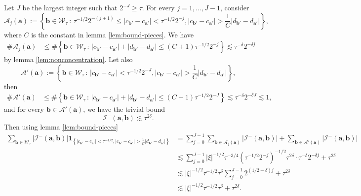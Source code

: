 \documentclass[12pt]{amsart}
\newcommand*\abs[1]{
	\left|#1\right|
}
\theoremstyle{definition}
\renewcommand{\leq}{\leqslant}
\renewcommand{\geq}{\geqslant}
\begin{document}
Let $J$ be the largest integer such that $2^{-J} \geq \tau$. For every $j = 1, \ldots, J - 1$, consider
\[\mathcal{A}_j(\mathbf{a}) := \left\{\mathbf{b} \in \mathcal{W}_\tau\,:\,\tau^{-1/2}2^{-(j + 1)} \leq \abs{c_{\mathbf{b}'} - c_{\mathbf{a}'}} < \tau^{-1/2}2^{-j}, \abs{c_{\mathbf{b}'} - c_{\mathbf{a}'}} > \frac{1}{C}\abs{d_{\mathbf{b}'} - d_{\mathbf{a}'}}\right\},\]
where $C$ is the constant in lemma \ref{lem:bound-pieces}. We have
\begin{align*}
\#\mathcal{A}_j(\mathbf{a})
&\leq \#\left\{\mathbf{b}\in\mathcal{W}_\tau\,:\,\abs{c_{\mathbf{b}'} - c_{\mathbf{a}'}} + \abs{d_{\mathbf{b}'} - d_{\mathbf{a}'}} \leq (C + 1)\tau^{-1/2}2^{-j}\right\}
\lesssim \tau^{-\delta}2^{-\delta j}
\end{align*}
by lemma \ref{lem:nonconcentration}. Let also
\[\mathcal{A}'(\mathbf{a}) := \left\{\mathbf{b} \in \mathcal{W}_\tau\,:\, \abs{c_{\mathbf{b}'} - c_{\mathbf{a}'}} < \tau^{-1/2}2^{-J}, \abs{c_{\mathbf{b}'} - c_{\mathbf{a}'}} > \frac{1}{C}\abs{d_{\mathbf{b}'} - d_{\mathbf{a}'}}\right\},\]
then
\begin{align*}
\#\mathcal{A}'(\mathbf{a})
&\leq \#\left\{\mathbf{b}\in\mathcal{W}_\tau\,:\,\abs{c_{\mathbf{b}'} - c_{\mathbf{a}'}} + \abs{d_{\mathbf{b}'} - d_{\mathbf{a}'}} \leq (C + 1)\tau^{-1/2}2^{-J}\right\}
\lesssim \tau^{-\delta}2^{-\delta J} \lesssim 1,
\end{align*}
and for every $\mathbf{b} \in \mathcal{A}'(\mathbf{a})$, we have the trivial bound
\[\mathcal{I}^{-}(\mathbf{a},\mathbf{b}) \lesssim \tau^{2\delta}.\]
Then using lemma \ref{lem:bound-pieces}
\begin{align*}
\sum_{\mathbf{b} \in \mathcal{W}_\tau} \abs{\mathcal{I}^{-}(\mathbf{a}, \mathbf{b})}\mathbf{1}_{\left\{\abs{c_{\mathbf{b}'} - c_{\mathbf{a}'}} < \tau^{-1/2}, \abs{c_{\mathbf{b}'} - c_{\mathbf{a}'}} > \frac{1}{C}\abs{d_{\mathbf{b}'} - d_{\mathbf{a}'}}\right\}  }
&= \sum_{j = 0}^{J - 1}\sum_{\mathbf{b} \in \mathcal{A}_j(\mathbf{a})} \abs{\mathcal{I}^{-}(\mathbf{a}, \mathbf{b})} + \sum_{\mathbf{b} \in \mathcal{A}'(\mathbf{a})} \abs{\mathcal{I}^{-}(\mathbf{a}, \mathbf{b})} \\
&\lesssim \sum_{j = 0}^{J - 1} \abs{\xi}^{-1/2}\tau^{-3/4}\left(\tau^{-1/2}2^{-j}\right)^{-1/2}\tau^{2\delta}\cdot\tau^{-\delta}2^{-\delta j} + \tau^{2\delta} \\
&\lesssim \abs{\xi}^{-1/2} \tau^{-1/2}\tau^{\delta} \sum_{j = 0}^{J - 1}2^{(1/2-\delta)j} + \tau^{2\delta} \\
&\lesssim \abs{\xi}^{-1/2}\tau^{-1/2}\tau^{\delta} + \tau^{2\delta}.
\end{align*}
\end{document}
